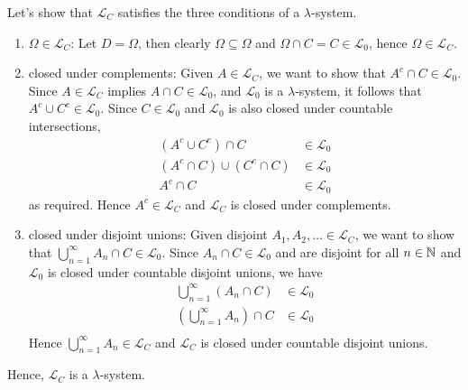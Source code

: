 \documentclass[12pt]{article}
\begin{document}
\begin{problem}[4]
Let's show that $ \mathscr{L}_C$ satisfies the three conditions of a $\lambda$-system.
\begin{enumerate}[label=(\roman*)]
	\item $ \Omega \in \mathscr{L}_C$: Let $ D = \Omega$, then clearly $ \Omega \subseteq \Omega$ and $ \Omega \cap C = C \in \mathscr{L}_0$, hence $ \Omega \in \mathscr{L}_C$.
	\item closed under complements: Given $ A \in \mathscr{L}_C$, we want to show that $ A^{c} \cap C \in \mathscr{L}_0$. Since $ A \in \mathscr{L}_C$ implies $ A \cap C \in \mathscr{L}_0$, and $ \mathscr{L}_0$ is a $\lambda$-system, it follows that $ A^{c} \cup C^{c} \in \mathscr{L}_0$. Since $ C \in \mathscr{L}_0$ and $ \mathscr{L}_0$ is also closed under countable intersections, 
		\begin{align*}
			\left( A^{c} \cup C^{c} \right) \cap C &\in \mathscr{L}_0\\
			\left( A^{c} \cap C \right) \cup \left( C^{c} \cap C \right) &\in \mathscr{L}_0\\
			A^{c} \cap C &\in \mathscr{L}_0
		\end{align*}
		as required. Hence $ A^{c} \in \mathscr{L}_C$ and $ \mathscr{L}_C$ is closed under complements.
	\item closed under disjoint unions: Given disjoint $ A_1,A_2,\ldots \in \mathscr{L}_C$, we want to show that $ \bigcup_{ n =1}^{\infty} A_n \cap C \in \mathscr{L}_0$. Since $ A_n \cap C \in \mathscr{L}_0$ and are disjoint for all $ n \in \mathbb{N}$ and $ \mathscr{L}_0$ is closed under countable disjoint unions, we have
		\begin{align*}
			\bigcup_{ n =1}^{\infty} \left( A_n \cap C \right) &\in \mathscr{L}_0\\
			\left( \bigcup_{ n =1}^{\infty} A_n \right) \cap C & \in \mathscr{L}_0\\
		\end{align*}
		Hence $ \bigcup_{ n =1}^{\infty} A_n \in \mathscr{L}_C$ and $ \mathscr{L}_C$ is closed under countable disjoint unions. 
\end{enumerate}
Hence, $ \mathscr{L}_C$ is a $\lambda$-system.
\end{problem}
\end{document}
